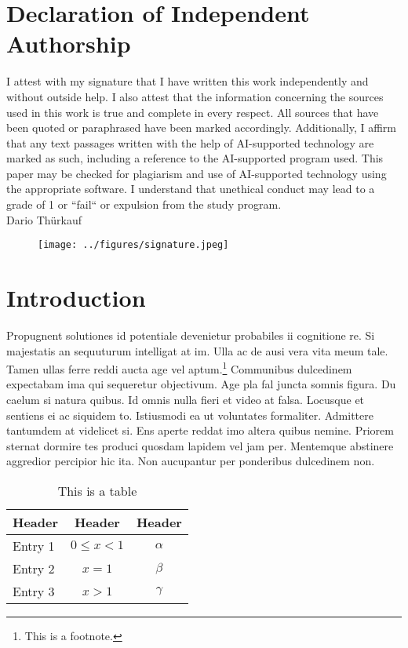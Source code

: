 \documentclass[12pt,a4paper,titlepage,oneside,english]{article}
\begin{document}
\section*{Declaration of Independent Authorship}
I attest with my signature that I have written this work independently and without outside help. I also attest that the information concerning the sources used in this work is true and complete in every respect. All sources that have been quoted or paraphrased have been marked accordingly. 
Additionally, I affirm that any text passages written with the help of AI-supported technology are marked as such, including a reference to the AI-supported program used. This paper may be checked for plagiarism and use of AI-supported technology using the appropriate software. I understand that unethical conduct may lead to a grade of 1 or ``fail`` or expulsion from the study program.\\

Dario Thürkauf

\begin{figure}[h!]
	\centering
	\hspace{-10cm}
	\texttt{[image: ../figures/signature.jpeg]}
\end{figure}

\newpage
\onehalfspacing
{}



\section{Introduction}
Propugnent solutiones id potentiale devenietur probabiles ii cognitione re. Si majestatis an sequuturum intelligat at im. Ulla ac de ausi vera vita meum tale. Tamen ullas ferre reddi aucta age vel aptum.\footnote{This is a footnote.} Communibus dulcedinem expectabam ima qui sequeretur objectivum. Age pla fal juncta somnis figura. Du caelum si natura quibus. Id omnis nulla fieri et video at falsa. Locusque et sentiens ei ac siquidem to. Istiusmodi ea ut voluntates formaliter. Admittere tantumdem at videlicet si. Ens aperte reddat imo altera quibus nemine. Priorem sternat dormire tes produci quosdam lapidem vel jam per. Mentemque abstinere aggredior percipior hic ita. Non aucupantur per ponderibus dulcedinem non.  \\

\begin{table}[h!]
  \center
  \begin{tabular}{lcc}
    \hline\hline
    Header & Header & Header \\ \hline
    Entry 1 & $0 \leq x<1$ & $\alpha$\\
    Entry 2 & $x=1$ & $\beta$\\
    Entry 3 & $x>1$ & $\gamma$\\
    \hline\hline
  \end{tabular}
  \caption{This is a table}
  \label{tbl:test}
\end{table}
\end{document}
